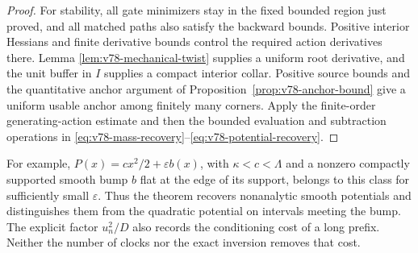 \begin{proof}
For stability, all gate minimizers stay in the fixed bounded region
just proved, and all matched paths also satisfy the backward bounds.  Positive interior Hessians and finite derivative
bounds control the required action derivatives there.  Lemma
\ref{lem:v78-mechanical-twist} supplies a uniform root derivative,
and the unit buffer in $I$ supplies a compact interior collar.  Positive
source bounds and the quantitative anchor argument of
Proposition~\ref{prop:v78-anchor-bound} give a uniform usable anchor
among finitely many corners.  Apply the finite-order generating-action
estimate and then the bounded evaluation and subtraction operations in
\eqref{eq:v78-mass-recovery}--\eqref{eq:v78-potential-recovery}.
\end{proof}

For example, $P(x)=c x^2/2+\varepsilon b(x)$, with $\kappa<c<\Lambda$
and a nonzero compactly supported smooth bump $b$ flat at the edge of
its support, belongs to this class for sufficiently small $\varepsilon$.
Thus the theorem recovers nonanalytic smooth potentials and distinguishes
them from the quadratic potential on intervals meeting the bump.  The
explicit factor $u_n^2/D$ also records the conditioning cost of a long
prefix.  Neither the number of clocks nor the exact inversion removes
that cost.
